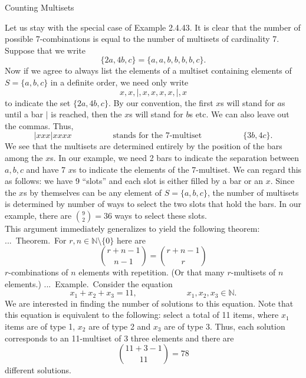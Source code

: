 \documentclass[smaller,hyperref={CJKbookmarks=true}]{beamer}
\newcommand{\N}{\mathbb{N}} \newcommand{\Z}{\mathbb{Z}} \newcommand{\Q}{\mathbb{Q}}
\newcounter{zhuo}[subsection]
\renewcommand{\thezhuo}{\thesection.\thesubsection.\arabic{zhuo}}
\newenvironment{EXAMPLE}{\stepcounter{zhuo}\alert{\!\thezhuo.~Example.\,}}{}
\newenvironment{THEOREM}{\stepcounter{zhuo}\alert{\thezhuo.~Theorem.\,}}{}
\begin{document}
\begin{frame}{Counting Multisets}
\begin{spacing}{1.05}
Let us stay with the special case of Example 2.4.43. It is clear that the
number of possible 7-combinations is equal to the number of multisets of
cardinality 7. Suppose that we write
\[\{2a,4b,c\}=\{a,a,b,b,b,b,c\}.\]
Now if we agree to always list the elements of a multiset containing elements of $S=\{a,b,c\}$ in a definite order, we need only write
\[x,x,\mid,x,x,x,x,\mid,x\]
to indicate the set $\{2a,4b,c\}$. By our convention, the first $x$s will stand for $a$s until a bar $\mid$ is reached, then the $x$s will stand for $b$s etc. We can also leave out the commas. Thus,
\[|xxx|xxxx\qquad\qquad\quad\text{stands for the 7-multiset}\qquad\qquad\quad
\{3b,4c\}.\]
\newpage
We see that the multisets are determined entirely by the position of the
bars among the $x$s. In our example, we need 2 bars to indicate the
separation between $a, b, c$ and have 7 $x$s to indicate the elements of the
7-multiset. We can regard this as follows: we have 9 ``slots'' and each slot
is either filled by a bar or an $x$. Since the $x$s by themselves can be any
element of $S=\{a,b,c\}$, the number of multisets is determined by number of ways to select the two slots that hold the bars. In our example, there are $\binom{9}{2}=36$ ways to select these slots.\\[6pt]
This argument immediately generalizes to yield the following theorem:\\[5pt]
\begin{THEOREM}
For $r,n\in\N\setminus\{0\}$ here are
\[\binom{r+n-1}{n-1}=\binom{r+n-1}{r}\]
$r$-combinations of $n$ elements with repetition. (Or that many $r$-multisets of $n$ elements.)
\end{THEOREM}
\newpage
\vspace*{10pt}
\begin{EXAMPLE}
Consider the equation
\[x_1+x_2+x_3=11,\qquad\qquad\qquad
x_1,x_2,x_3\in\N.\]
We are interested in finding the number of solutions to this equation.
Note that this equation is equivalent to the following: select a total of 11
items, where $x_1$ items are of type 1, $x_2$ are of type 2 and $x_3$ are of type 3. Thus, each solution corresponds to an 11-multiset of 3 three elements and there are
\[\binom{11+3-1}{11}=78\]
different solutions.
\end{EXAMPLE}
\end{spacing}
\end{frame}
\end{document}
